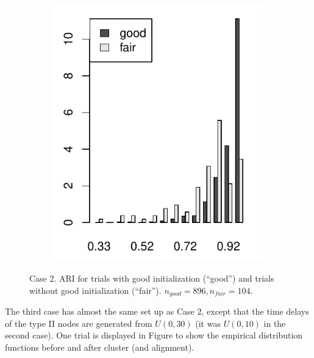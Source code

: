 \begin{figure}
\begin{subfigure}{.45\textwidth}
\includegraphics[width=\linewidth]{../simulation/plots/ARI_hist_case2}
\caption{}
\label{fig: ARI hist, case 2}
\end{subfigure}
\caption{Case 2. ARI for trials with good initialization (``good'') and trials without good initialization (``fair'').
$n_{good}=896, n_{fair}=104.$
}
\label{fig: ARI, case2}
\end{figure}


The third case has almost the same set up as Case 2, except that 
the time delays of the type II nodes are generated from $U(0,30)$ (it was $U(0,10)$ in the second case).
One trial is displayed in Figure 
to show the empirical distribution functions before and after cluster (and alignment).


